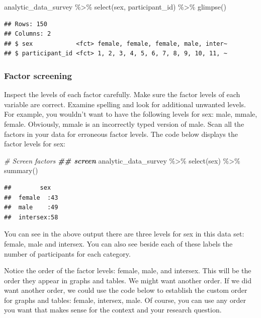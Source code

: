 \documentclass[
]{krantz}
\makeatletter
\newenvironment{Shaded}{\begin{snugshade}}{\end{snugshade}}
\newcommand{\CommentTok}[1]{\textcolor[rgb]{0.37,0.37,0.37}{\textit{#1}}}
\newcommand{\DocumentationTok}[1]{\textcolor[rgb]{0.37,0.37,0.37}{\textbf{\textit{#1}}}}
\newcommand{\FunctionTok}[1]{\textcolor[rgb]{0,0,0}{#1}}
\newcommand{\NormalTok}[1]{#1}
\newcommand{\SpecialCharTok}[1]{\textcolor[rgb]{0,0,0}{#1}}
\newenvironment{kframe}{%
\medskip{}
\setlength{\fboxsep}{.8em}
 \def\at@end@of@kframe{}%
 \ifinner\ifhmode%
  \def\at@end@of@kframe{\end{minipage}}%
  \begin{minipage}{\columnwidth}%
 \fi\fi%
 \def\FrameCommand##1{\hskip\@totalleftmargin \hskip-\fboxsep
 \colorbox{shadecolor}{##1}\hskip-\fboxsep
     \hskip-\linewidth \hskip-\@totalleftmargin \hskip\columnwidth}%
 \MakeFramed {\advance\hsize-\width
   \@totalleftmargin\z@ \linewidth\hsize
   \@setminipage}}%
 {\par\unskip\endMakeFramed%
 \at@end@of@kframe}
\renewenvironment{Shaded}{\begin{kframe}}{\end{kframe}}
\makeatother
\begin{document}
\begin{Shaded}
\begin{Highlighting}[]
\NormalTok{analytic\_data\_survey }\SpecialCharTok{\%\textgreater{}\%}
  \FunctionTok{select}\NormalTok{(sex, participant\_id) }\SpecialCharTok{\%\textgreater{}\%}
  \FunctionTok{glimpse}\NormalTok{()}
\end{Highlighting}
\end{Shaded}

\begin{verbatim}
## Rows: 150
## Columns: 2
## $ sex            <fct> female, female, female, male, inter~
## $ participant_id <fct> 1, 2, 3, 4, 5, 6, 7, 8, 9, 10, 11, ~
\end{verbatim}

\hypertarget{factor-screening-1}{%
\subsubsection{Factor screening}\label{factor-screening-1}}

Inspect the levels of each factor carefully. Make sure the factor levels of each variable are correct. Examine spelling and look for additional unwanted levels. For example, you wouldn't want to have the following levels for sex: male, mmale, female. Obviously, mmale is an incorrectly typed version of male. Scan all the factors in your data for erroneous factor levels. The code below displays the factor levels for sex:

\begin{Shaded}
\begin{Highlighting}[]
\CommentTok{\# Screen factors}
\DocumentationTok{\#\# screen}
\NormalTok{analytic\_data\_survey }\SpecialCharTok{\%\textgreater{}\%}
  \FunctionTok{select}\NormalTok{(sex) }\SpecialCharTok{\%\textgreater{}\%}
  \FunctionTok{summary}\NormalTok{()}
\end{Highlighting}
\end{Shaded}

\begin{verbatim}
##        sex    
##  female  :43  
##  male    :49  
##  intersex:58
\end{verbatim}

You can see in the above output there are three levels for sex in this data set: female, male and intersex. You can also see beside each of these labels the number of participants for each category.

Notice the order of the factor levels: female, male, and intersex. This will be the order they appear in graphs and tables. We might want another order. If we did want another order, we could use the code below to establish the custom order for graphs and tables: female, intersex, male. Of course, you can use any order you want that makes sense for the context and your research question.
\end{document}
